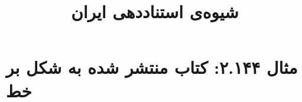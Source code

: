 \documentclass[a4paper,10pt]{article}
\begin{document}
\title{شیوه‌ی استناددهی ایران
 }
\author{}
\date{}
\maketitle



\section*{مثال ۲.۱۴۴: کتاب منتشر شده به شکل بر خط}

\cite{لامبرت}\\
\cite{grolemund2017}\\
\cite{nicholas2019}\\






\end{document}
